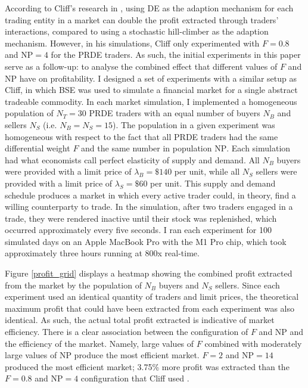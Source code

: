 \documentclass[a4paper,twoside]{article}
\begin{document}
According to Cliff's research in \cite{PRDE}, using DE as the adaption mechanism for each trading entity in a market can double the profit extracted through traders' interactions, compared to using a stochastic hill-climber as the adaption mechanism.
However, in his simulations, Cliff only experimented with $F=0.8$ and $\mathrm{NP}=4$ for the PRDE traders.
As such, the initial experiments in this paper serve as a follow-up: to analyse the combined effect that different values of $F$ and $\mathrm{NP}$ have on profitability.
I designed a set of experiments with a similar setup as Cliff, in which BSE was used to simulate a financial market for a single abstract tradeable commodity.
In each market simulation, I implemented a homogeneous population of $N_T=30$ PRDE traders with an equal number of buyers $N_B$ and sellers $N_S$ (i.e. $N_B=N_S=15$).
The population in a given experiment was homogeneous with respect to the fact that all PRDE traders had the same differential weight $F$ and the same number in population $\mathrm{NP}$.
Each simulation had what economists call perfect elasticity of supply and demand.
All $N_B$ buyers were provided with a limit price of $\lambda_B=\$140$ per unit, while all $N_S$ sellers were provided with a limit price of $\lambda_S=\$60$ per unit.
This supply and demand schedule produces a market in which every active trader could, in theory, find a willing counterparty to trade.
In the simulation, after two traders engaged in a trade, they were rendered inactive until their stock was replenished, which occurred approximately every five seconds.
I ran each experiment for 100 simulated days on an Apple MacBook Pro with the M1 Pro chip, which took approximately three hours running at 800x real-time.

Figure \ref{profit_grid} displays a heatmap showing the combined profit extracted from the market by the population of $N_B$ buyers and $N_S$ sellers.
Since each experiment used an identical quantity of traders and limit prices, the theoretical maximum profit that could have been extracted from each experiment was also identical.
As such, the actual total profit extracted is indicative of market efficiency.
There is a clear association between the configuration of $F$ and $\mathrm{NP}$ and the efficiency of the market.
Namely, large values of $F$ combined with moderately large values of $\mathrm{NP}$ produce the most efficient market.
$F=2$ and $\mathrm{NP}=14$ produced the most efficient market; 3.75\% more profit was extracted than the $F=0.8$ and $\mathrm{NP}=4$ configuration that Cliff used \cite{PRDE}.
\end{document}
